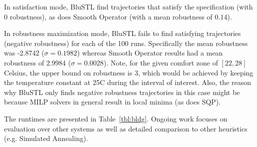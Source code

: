 In satisfaction mode, BluSTL find trajectories that satisfy the specification (with $0$ robustness), as does Smooth Operator (with a mean robustness of $0.14$).

In robustness maximization mode, BluSTL fails to find satisfying trajectories (negative robustness) for each of the 100 runs.
Specifically the mean robustness was -2.8742 ($\sigma = 0.1982$) whereas Smooth Operator results had a mean robustness of 2.9984 ($\sigma = 0.0028$). 
Note, for the given comfort zone of $[22,28]$ Celsius, the upper bound on robustness is $3$, which would be achieved by keeping the temperature constant at 25C during the interval of interest. Also, the reason why BluSTL only finds negative robustness trajectories in this case might be because MILP solvers in general result in local minima (as does SQP).

The runtimes are presented in Table~\ref{tbl:bldg}. Ongoing work focuses on evaluation over other systems as well as detailed comparison to other heuristics (e.g. Simulated Annealing). %

